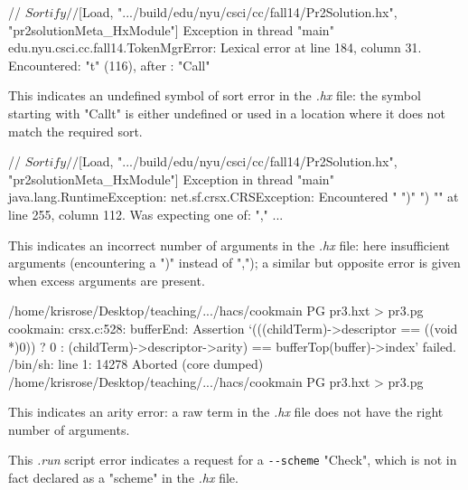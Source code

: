 \documentclass[11pt]{article} %
\begin{document}
\begin{error}\leavevmode
  \begin{code}
// $Sortify
// $[Load, ".../build/edu/nyu/csci/cc/fall14/Pr2Solution.hx", "pr2solutionMeta_HxModule"]
Exception in thread "main" edu.nyu.csci.cc.fall14.TokenMgrError:
   Lexical error at line 184, column 31.  Encountered: "t" (116), after : "Call"
  \end{code}
  This indicates an undefined symbol of sort error in the \emph{.hx} file: the symbol
  starting with "Callt" is either undefined or used in a location where it does not match the
  required sort.
\end{error}

\begin{error}\leavevmode
  \begin{code}
// $Sortify
// $[Load, ".../build/edu/nyu/csci/cc/fall14/Pr2Solution.hx", "pr2solutionMeta_HxModule"]
Exception in thread "main" java.lang.RuntimeException: net.sf.crsx.CRSException:
   Encountered " ")" ") "" at line 255, column 112.
Was expecting one of:
    "," ...
  \end{code}
  This indicates an incorrect number of arguments in the \emph{.hx} file: here insufficient
  arguments (encountering a ")" instead of ","); a similar but opposite error is given when excess
  arguments are present.
\end{error}

\begin{error}\leavevmode
  \begin{code}
/home/krisrose/Desktop/teaching/.../hacs/cookmain PG pr3.hxt > pr3.pg
cookmain: crsx.c:528: bufferEnd: Assertion
   `(((childTerm)->descriptor == ((void *)0)) ? 0 :
        (childTerm)->descriptor->arity) == bufferTop(buffer)->index' failed.
/bin/sh: line 1: 14278 Aborted
  (core dumped) /home/krisrose/Desktop/teaching/.../hacs/cookmain PG pr3.hxt > pr3.pg
  \end{code}
  This indicates an arity error: a raw term in the \emph{.hx} file does not have the right number of
  arguments.
\end{error}

\begin{error}[]\leavevmode
  \begin{code}
« $Print-Check[
...
»
  \end{code}
  This \emph{.run} script error indicates a request for a \verb'--scheme' "Check", which is not in
  fact declared as a "scheme" in the \emph{.hx} file.
\end{error}
\end{document}
